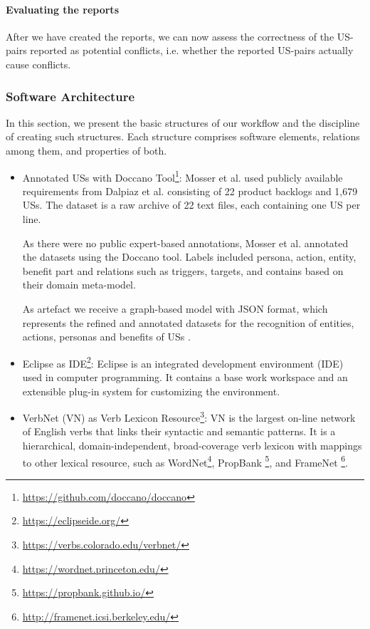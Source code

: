 \paragraph{Evaluating the reports} After we have created the reports, we can now assess the correctness of the US-pairs reported as potential conflicts, i.e. whether the reported US-pairs actually cause conflicts.
\subsubsection*{Software Architecture}\label{conflict_architectur}
In this section, we present the basic structures of our workflow and the discipline of creating such structures. Each structure comprises software elements, relations among them, and properties of both.
\begin{itemize}
	\item Annotated USs with Doccano Tool\footnote{\href{https://github.com/doccano/doccano}{https://github.com/doccano/doccano}}: Mosser et al. used publicly available requirements from Dalpiaz et al. \cite{Dalpiaz2018} consisting of 22 product backlogs and 1,679 USs. The dataset is a raw archive of 22 text files, each containing one US per line. 
	
	As there were no public expert-based annotations, Mosser et al. annotated the datasets using the Doccano tool. Labels included persona, action, entity, benefit part and relations such as triggers, targets, and contains based on their domain meta-model.
	
	As artefact we receive a graph-based model with JSON format, which represents the refined and annotated datasets for the recognition of entities, actions, personas and benefits of USs \cite{mosser2022modelling}.
	
	\item Eclipse as IDE\footnote{\href{https://eclipseide.org/}{https://eclipseide.org/}}: Eclipse is an integrated development environment (IDE) used in computer programming. It contains a base work workspace and an extensible plug-in system for customizing the environment.
	
	\item VerbNet (VN) as Verb Lexicon Resource\footnote{\href{https://verbs.colorado.edu/verbnet/}{https://verbs.colorado.edu/verbnet/}}: VN is the largest on-line network of English verbs that links their syntactic and semantic patterns. It is a hierarchical, domain-independent, broad-coverage verb lexicon with mappings to other lexical resource, such as WordNet\footnote{\href{https://wordnet.princeton.edu/}{https://wordnet.princeton.edu/}}, PropBank \footnote{\href{https://propbank.github.io/}{https://propbank.github.io/}}, and FrameNet \footnote{\href{http://framenet.icsi.berkeley.edu/}{http://framenet.icsi.berkeley.edu/}}. 
	

\end{itemize}
